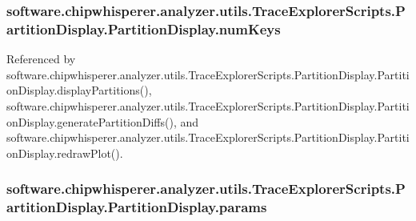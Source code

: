 \subsubsection[{num\+Keys}]{\setlength{\rightskip}{0pt plus 5cm}software.\+chipwhisperer.\+analyzer.\+utils.\+Trace\+Explorer\+Scripts.\+Partition\+Display.\+Partition\+Display.\+num\+Keys}\label{classsoftware_1_1chipwhisperer_1_1analyzer_1_1utils_1_1TraceExplorerScripts_1_1PartitionDisplay_1_1PartitionDisplay_a9609f827035095f248787dbde121fa08}


Referenced by software.\+chipwhisperer.\+analyzer.\+utils.\+Trace\+Explorer\+Scripts.\+Partition\+Display.\+Partition\+Display.\+display\+Partitions(), software.\+chipwhisperer.\+analyzer.\+utils.\+Trace\+Explorer\+Scripts.\+Partition\+Display.\+Partition\+Display.\+generate\+Partition\+Diffs(), and software.\+chipwhisperer.\+analyzer.\+utils.\+Trace\+Explorer\+Scripts.\+Partition\+Display.\+Partition\+Display.\+redraw\+Plot().

\hypertarget{classsoftware_1_1chipwhisperer_1_1analyzer_1_1utils_1_1TraceExplorerScripts_1_1PartitionDisplay_1_1PartitionDisplay_a957aad4fa311a332e164d2dd0a63140d}{}
\subsubsection[{params}]{\setlength{\rightskip}{0pt plus 5cm}software.\+chipwhisperer.\+analyzer.\+utils.\+Trace\+Explorer\+Scripts.\+Partition\+Display.\+Partition\+Display.\+params}\label{classsoftware_1_1chipwhisperer_1_1analyzer_1_1utils_1_1TraceExplorerScripts_1_1PartitionDisplay_1_1PartitionDisplay_a957aad4fa311a332e164d2dd0a63140d}


